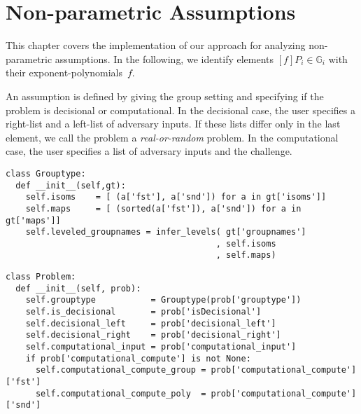 \chapter{Non-parametric Assumptions}

This chapter covers the implementation of our approach for
analyzing non-parametric assumptions.
In the following, we identify elements $[f]P_i \in \mathbb{G}_i$ with
  their exponent-polynomials~$f$.

An assumption is defined by giving the group setting and
  specifying if the problem is decisional or computational.
In the decisional case, the user specifies a right-list and a left-list of
  adversary inputs.
If these lists differ only in the last element, we call the problem
  a \emph{real-or-random} problem.
In the computational case, the user specifies a list of adversary inputs
  and the challenge.

\begin{verbatim}
class Grouptype:
  def __init__(self,gt):
    self.isoms    = [ (a['fst'], a['snd']) for a in gt['isoms']]
    self.maps     = [ (sorted(a['fst']), a['snd']) for a in gt['maps']]
    self.leveled_groupnames = infer_levels( gt['groupnames']
                                          , self.isoms
                                          , self.maps)
\end{verbatim}

\begin{verbatim}
class Problem:
  def __init__(self, prob):
    self.grouptype           = Grouptype(prob['grouptype'])
    self.is_decisional       = prob['isDecisional']
    self.decisional_left     = prob['decisional_left']
    self.decisional_right    = prob['decisional_right']
    self.computational_input = prob['computational_input']
    if prob['computational_compute'] is not None:
      self.computational_compute_group = prob['computational_compute']['fst']
      self.computational_compute_poly  = prob['computational_compute']['snd']
\end{verbatim}